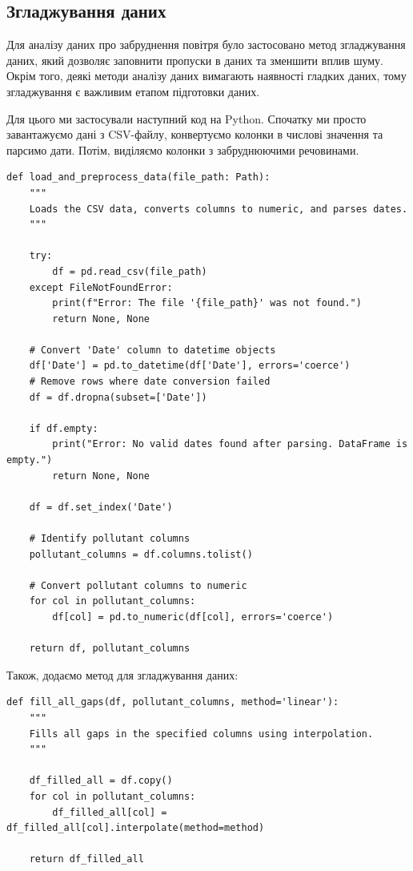 \documentclass{exam_template}
\begin{document}
\subsection{Згладжування даних}

Для аналізу даних про забруднення повітря було застосовано метод згладжування
даних, який дозволяє заповнити пропуски в даних та зменшити вплив шуму.
Окрім того, деякі методи аналізу даних вимагають наявності гладких 
даних, тому згладжування є важливим етапом підготовки даних.

Для цього ми застосували наступний код на Python. Спочатку ми просто 
завантажуємо дані з CSV-файлу, конвертуємо колонки в числові значення та
парсимо дати. Потім, виділяємо колонки з забруднюючими речовинами.
\begin{verbatim}
def load_and_preprocess_data(file_path: Path):
    """
    Loads the CSV data, converts columns to numeric, and parses dates.
    """
    
    try:
        df = pd.read_csv(file_path)
    except FileNotFoundError:
        print(f"Error: The file '{file_path}' was not found.")
        return None, None

    # Convert 'Date' column to datetime objects
    df['Date'] = pd.to_datetime(df['Date'], errors='coerce')
    # Remove rows where date conversion failed
    df = df.dropna(subset=['Date'])
    
    if df.empty:
        print("Error: No valid dates found after parsing. DataFrame is empty.")
        return None, None
    
    df = df.set_index('Date')

    # Identify pollutant columns
    pollutant_columns = df.columns.tolist()

    # Convert pollutant columns to numeric
    for col in pollutant_columns:
        df[col] = pd.to_numeric(df[col], errors='coerce')

    return df, pollutant_columns
\end{verbatim}

Також, додаємо метод для згладжування даних:
\begin{verbatim}
def fill_all_gaps(df, pollutant_columns, method='linear'):
    """
    Fills all gaps in the specified columns using interpolation.
    """
    
    df_filled_all = df.copy()
    for col in pollutant_columns:
        df_filled_all[col] = df_filled_all[col].interpolate(method=method)
        
    return df_filled_all
\end{verbatim}
\end{document}
